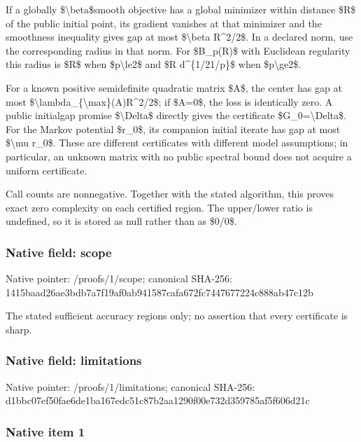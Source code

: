 \documentclass[10pt,a4paper]{article}
\begin{document}
If a globally \$\textbackslash{}beta\$smooth objective has a global minimizer within distance \$R\$ of the public initial point, its gradient vanishes at that minimizer and the smoothness inequality gives gap at most \$\textbackslash{}beta R\textasciicircum{}2/2\$. In a declared norm, use the corresponding radius in that norm. For \$B\_p(R)\$ with Euclidean regularity this radius is \$R\$ when \$p\textbackslash{}le2\$ and \$R d\textasciicircum{}\{1/21/p\}\$ when \$p\textbackslash{}ge2\$.

For a known positive semidefinite quadratic matrix \$A\$, the center has gap at most \$\textbackslash{}lambda\_\{\textbackslash{}max\}(A)R\textasciicircum{}2/2\$; if \$A=0\$, the loss is identically zero. A public initialgap promise \$\textbackslash{}Delta\$ directly gives the certificate \$G\_0=\textbackslash{}Delta\$. For the Markov potential \$r\_0\$, its companion initial iterate has gap at most \$\textbackslash{}mu r\_0\$. These are different certificates with different model assumptions; in particular, an unknown matrix with no public spectral bound does not acquire a uniform certificate.

Call counts are nonnegative. Together with the stated algorithm, this proves exact zero complexity on each certified region. The upper/lower ratio is undefined, so it is stored as null rather than as \$0/0\$.


\subsubsection{Native field: scope}


Native pointer: /proofs/1/scope; canonical SHA-256: 1415baad26ae3bdb7a7f19af\allowbreak{}0ab941587cafa672fc744767\allowbreak{}7224c888ab47c12b


The stated sufficient accuracy regions only; no assertion that every certificate is sharp.


\subsubsection{Native field: limitations}


Native pointer: /proofs/1/limitations; canonical SHA-256: d1bbc07ef50fae6de1ba167e\allowbreak{}dc51c87b2aa1290f00e732d3\allowbreak{}59785af5f606d21c



\subsubsection{Native item 1}
\end{document}

